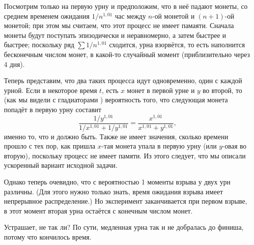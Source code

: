 Посмотрим только на первую урну и предположим, что в неё падают монеты, со среднем временем ожидания $1/n^{1{,}01}$ час между $n$-ой монетой и $(n+1)$-ой монетой; при этом мы считаем, что этот процесс не имеет памаяти.
Сначала монеты будут поступать эпизодически и неравномерно, а затем быстрее и быстрее;
поскольку ряд $\sum 1/n^{1{,}01}$ сходится, урна взорвётся, то есть наполнится бесконечным числом монет, в какой-то случайный момент (приблизительно через 4 дня).

Теперь представим, что два таких процесса идут одновременно, один с каждой урной.
Если в некоторое время $t$, есть $x$ монет в первой урне и $y$ во второй, то (как мы видели с гладиаторами%
) 
вероятность того, что следующая монета попадёт в первую урну составит
\[\frac{1/y^{1{,}01}}{1/x^{1{,}01}+1/y^{1{,}01}}=\frac{x^{1{,}01}}{x^{1{,}01}+y^{1{,}01}},\]
именно то, что и должно быть.
Также не имеет значения, сколько времени прошло с тех пор, как пришла $x$-тая монета упала в первую урну (или $y$-овая во вторую), поскольку процесс не имеет памяти.
Из этого следует, что мы описали ускоренный вариант исходной задачи.

Однако теперь очевидно, что с вероятностью 1 моменты взрыва у двух урн различны.
(Для этого нужно только знать, время ожидания взрыва имеет непрерывное распределение.)
Но эксперимент заканчивается при первом взрыве, в этот момент вторая урна остаётся с конечным числом монет.\heart

Устрашает, не так ли?
По сути, медленная урна так и не добралась до финиша, потому что кончилось время.
